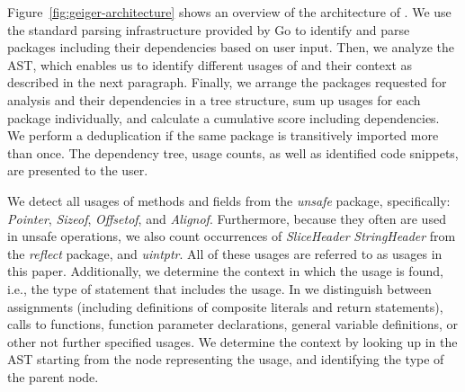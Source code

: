 Figure~\ref{fig:geiger-architecture} shows an overview of the architecture of \toolUsage{}.
We use the standard parsing infrastructure provided by Go to identify and parse packages including their dependencies based on user input.
Then, we analyze the AST, %
which enables us to identify different usages of \unsafe{} and their context as described in the next paragraph.
Finally, we arrange the packages requested for analysis and their dependencies in a tree structure, sum up \unsafe{} usages for each package individually, and calculate a cumulative score including dependencies.
We perform a deduplication if the same package is transitively imported more than once.
The \unsafe{} dependency tree, usage counts, as well as identified code snippets, are presented to the user.


We detect all usages of methods and fields from the \textit{unsafe} package, specifically: \textit{Pointer}, \textit{Sizeof}, \textit{Offsetof}, and \textit{Alignof}.
Furthermore, because they often are used in unsafe operations, we also count occurrences of \textit{SliceHeader} \textit{StringHeader} from the \textit{reflect} package, and \textit{uintptr}.
All of these usages are referred to as \unsafe{} usages in this paper.
Additionally, we determine the context in which the \unsafe{} usage is found, i.e., 
the type of statement that includes the \unsafe{} usage.
In \toolUsage{} we distinguish between assignments (including definitions of composite literals and return statements), calls to functions, function parameter declarations, general variable definitions, or other not further specified usages.
We determine the context by looking up in the AST starting from the node representing the \unsafe{} usage, and identifying the type of the parent node.




